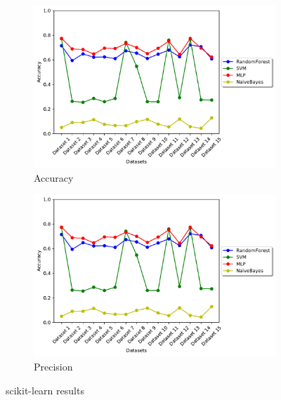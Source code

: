 


\begin{figure}[H]
\centering
\begin{subfigure}[t]{0.475\textwidth}
    \centering
    \includegraphics[page=1, width=\linewidth]{images/results_scikit.pdf}
    \caption{Accuracy}
    \label{fig:scikit_accuracy}
\end{subfigure}
\begin{subfigure}[t]{0.475\textwidth}
    \centering
    \includegraphics[page=3, width=\linewidth]{images/results_scikit.pdf}
    \caption{Precision}
    \label{fig:scikit_prec}
\end{subfigure}
\caption{scikit-learn results}
\end{figure}
